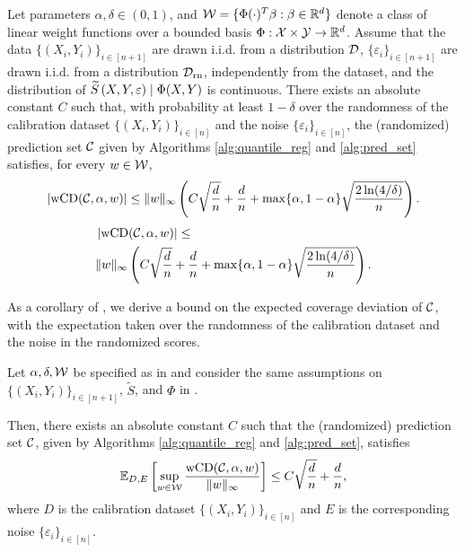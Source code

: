 \begin{theorem}
    Let parameters $\alpha,\delta \in (0,1)$, and ${\cal W} = \{\Phi(\cdot)^T \beta :\beta \in \mathbb{R}^d\}$ denote a class of linear weight functions over a bounded basis $\Phi : {\cal X} \times {\cal Y} \to \mathbb{R}^d$. Assume that the data $\{(X_i,Y_i)\}_{i\in [n+1]}$ are drawn \mbox{i.i.d.} from a distribution $\calD$, $\{\varepsilon_i\}_{i\in [n+1]}$ are drawn \mbox{i.i.d.} from a distribution $\calD_{\text{rn}}$, independently from the dataset, and the distribution of $\tS\left(X,Y, \varepsilon\right) \mid \Phi(X,Y)$ is continuous. There exists an absolute constant $C$ such that, with probability at least $1-\delta$ over the randomness of the calibration dataset $\{(X_i,Y_i)\}_{i\in [n]}$ and the noise $\{\varepsilon_i\}_{i \in [n]}$, the (randomized) prediction set ${\cal C}$ given by Algorithms \ref{alg:quantile_reg} and \ref{alg:pred_set} satisfies, for every $w \in {\cal W}$,
\ifarxiv
\begin{align*}
\left|\operatorname{wCD}({\cal C}, \alpha, w)\right| \leq 
 \|w\|_{\infty} \left( C \sqrt{\frac{d}{n}} + \frac{d}{n} +\max \{\alpha, 1-\alpha\}\sqrt{\frac{2\ln(4/\delta)}{n}}  \right).
\end{align*}
\else
\begin{align*}
&\left|\operatorname{wCD}({\cal C}, \alpha, w)\right| \leq \\
& \|w\|_{\infty} \left( C \sqrt{\frac{d}{n}} + \frac{d}{n} +\max \{\alpha, 1-\alpha\}\sqrt{\frac{2\ln(4/\delta)}{n}}  \right).
\end{align*}
\fi

\label{thm:jointcondcov}
\end{theorem}
As a corollary of , we derive a bound on the expected coverage deviation of ${\cal C}$, with the expectation taken over the randomness of the calibration dataset and the noise in the randomized scores. 
\begin{corollary}
Let $\alpha, \delta, {\cal W}$ be specified as in  and consider the same assumptions on $\{(X_i, Y_i)\}_{i\in [n+1]}$, $\tilde S$, and $\Phi$  in . 
\iffalse
 Assume that $\{(X_i,Y_i)\}_{i\in [n+1]}$ are drawn \mbox{i.i.d.} from a distribution $\calD$, $\{\varepsilon_i\}_{i\in [n+1]}$ are drawn \mbox{i.i.d.} from a distribution $\calD_{\text{rn}}$, independently from the dataset, and the distribution of $\tS\left(X,Y, \varepsilon\right) \mid \Phi(X,Y)$ is continuous.
 \fi
 Then, there exists an absolute constant $C$ such that the (randomized) prediction set ${\cal C}$, given by Algorithms \ref{alg:quantile_reg} and \ref{alg:pred_set}, satisfies
\begin{align*}
\mathbb{E}_{D,E}  \left[ \sup_{w\in{\cal W}} \frac{\operatorname{wCD}({\cal C}, \alpha,w)}{\|w\|_{\infty}}\right] \leq 
C \sqrt{\frac{d}{n}} + \frac{d}{n},
\end{align*}
where $D$ is the calibration dataset $\{(X_i,Y_i)\}_{i\in [n]}$ and $E$ is the corresponding noise $\{\varepsilon_i\}_{i\in [n]}$.
\label{cor: expected-cov}
\end{corollary}

